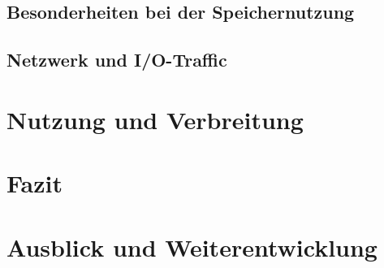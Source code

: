 \documentclass[hyperref={pdfpagelabels=false}]{beamer}
\begin{document}
 \subsection{Besonderheiten bei der Speichernutzung}
\begin{frame} 

\end{frame}

 \subsection{Netzwerk und I/O-Traffic}
\begin{frame} 

\end{frame}


\section{Nutzung und Verbreitung}
\begin{frame} 

\end{frame}


\section{ Fazit}
\begin{frame} 

\end{frame}

\section{Ausblick und Weiterentwicklung}
\begin{frame} 

\end{frame}
\end{document}
